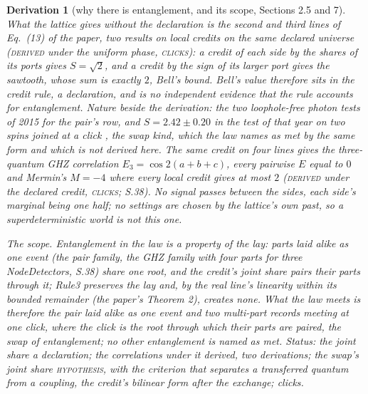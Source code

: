 \documentclass[pdflatex,sn-mathphys-num]{sn-jnl}
\newcommand{\claimmark}[1]{\textup{\textsc{#1}}}
\newcommand{\fence}[1]{\textup{\textsc{#1}}}
\theoremstyle{thmstyleone}
\newtheorem{derivation}{Derivation}
\begin{document}
\begin{derivation}[why there is entanglement, and its scope, Sections 2.5 and 7]
What the lattice gives without the declaration is the second and third lines of Eq.~(13) of the paper, two results on local credits on the same declared universe (\claimmark{derived} under the uniform phase, \fence{clicks}): a credit of each side by the shares of its ports gives $S = \sqrt 2$, and a credit by the sign of its larger port gives the sawtooth, whose sum is exactly $2$, Bell's bound. Bell's value therefore sits in the credit rule, a declaration, and is no independent evidence that the rule accounts for entanglement. Nature beside the derivation: the two loophole-free photon tests of 2015 for the pair's row, and $S = 2.42 \pm 0.20$ in the test of that year on two spins joined at a click \cite{hensen}, the swap kind, which the law names as met by the same form and which is not derived here. The same credit on four lines gives the three-quantum GHZ correlation $E_3 = \cos 2(a + b + c)$, every pairwise $E$ equal to $0$ and Mermin's $M = -4$ where every local credit gives at most $2$ (\claimmark{derived} under the declared credit, \fence{clicks}; S.38). No signal passes between the sides, each side's marginal being one half; no settings are chosen by the lattice's own past, so a superdeterministic world is not this one.

\emph{The scope.} Entanglement in the law is a property of the lay: parts laid alike as one event (the pair family, the GHZ family with four parts for three NodeDetectors, S.38) share one root, and the credit's joint share pairs their parts through it; Rule3 preserves the lay and, by the real line's linearity within its bounded remainder (the paper's Theorem 2), creates none. What the law meets is therefore the pair laid alike as one event and two multi-part records meeting at one click, where the click is the root through which their parts are paired, the swap of entanglement; no other entanglement is named as met. \emph{Status:} the joint share a declaration; the correlations under it derived, two derivations; the swap's joint share \claimmark{hypothesis}, with the criterion that separates a transferred quantum from a coupling, the credit's bilinear form after the exchange; clicks.
\end{derivation}
\end{document}
